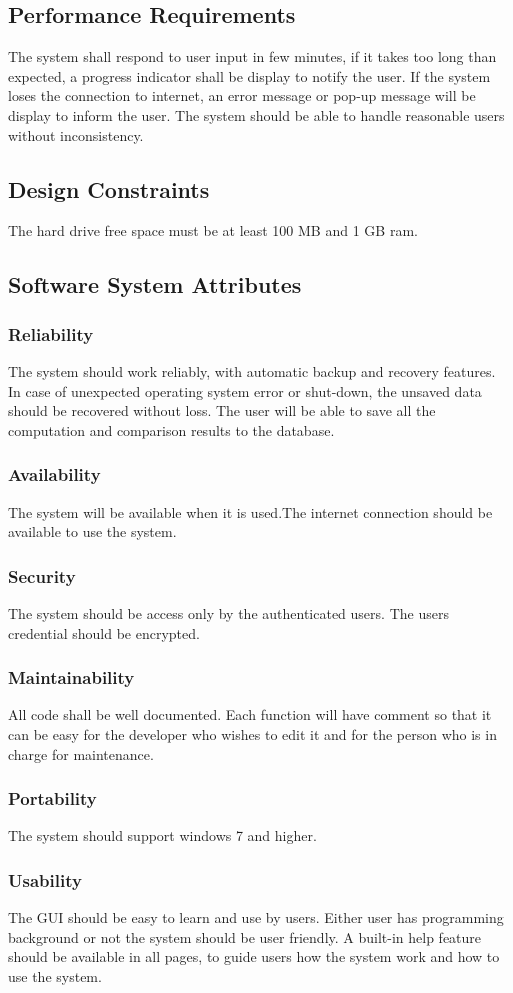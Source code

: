 \documentclass[a4paper,12pt]{article}
\begin{document}
\subsection{Performance Requirements}
The system shall respond to user input in few minutes, if it takes too long than expected, a progress indicator shall be display to notify the user.
If the system loses the connection to internet, an error message or pop-up message will be display to inform the user.
The system should be able to handle reasonable users without inconsistency.
\subsection{Design Constraints}
The hard drive free space must be at least 100 MB and 1 GB ram.
\subsection{Software System Attributes}
\subsubsection{Reliability}
The system should work reliably, with automatic backup and recovery features. In case of unexpected operating system error or shut-down, the unsaved data should be recovered without loss. The user will be able to save all the computation and comparison results to the database.
\subsubsection{Availability}
The system will be available when it is used.The internet connection should be available to use the system.
\subsubsection{ Security }
The system should be access only by the authenticated users. The users credential should be encrypted.
\subsubsection{Maintainability}
All code shall be well documented. Each function will have comment so that it can be easy for the developer who wishes to edit it and for the person who is in charge for maintenance.
\subsubsection{Portability}
The system should support windows 7 and higher.
\subsubsection{Usability}
 The GUI should be easy to learn and use by users. Either user has programming background or not the system should be user friendly. A built-in help feature should be available in all pages, to guide users how the system work and how to use the system.

\newpage
\clearpage
{}
\end{document}

